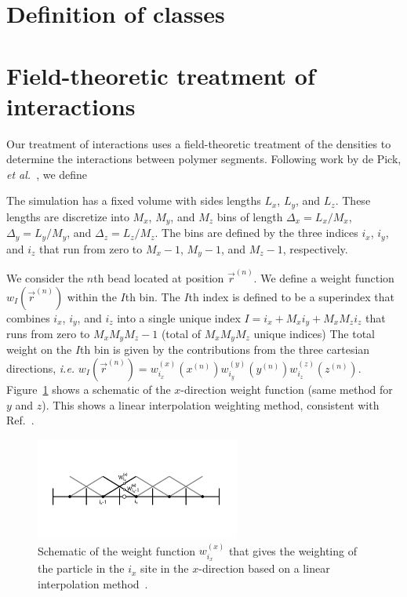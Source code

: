 \documentclass{simulation}
\begin{document}
\section{Definition of classes}



\newpage \clearpage

\section{Field-theoretic treatment of interactions}

Our treatment of interactions uses a field-theoretic treatment of the densities to determine the interactions between polymer
segments.  Following work by de Pick, \emph{et al.}~\cite{pikeTheoreticallyInformedCoarse2009}, we define 

The simulation has a fixed volume with sides lengths $L_{x}$, $L_{y}$, and $L_{z}$.
These lengths are discretize into $M_{x}$, $M_{y}$, and $M_{z}$ bins of length
$\Delta_{x} = L_{x}/M_{x}$, 
$\Delta_{y} = L_{y}/M_{y}$, and 
$\Delta_{z} = L_{z}/M_{z}$.
The bins are defined by the three indices 
$i_{x}$,
$i_{y}$, and
$i_{z}$ that run from zero to 
$M_{x}-1$, 
$M_{y}-1$, and
$M_{z}-1$, respectively.


We consider the $n$th bead located at position $\vec{r}^{(n)}$.
We define a weight function $w_{I}(\vec{r}^{(n)})$ within the $I$th bin.  
The $I$th index is defined to be a superindex that combines 
$i_{x}$,
$i_{y}$, and
$i_{z}$ into a single unique index $I= i_{x} + M_{x} i_{y} + M_{x}M_{z} i_{z}$ that
runs from zero to $M_{x}M_{y}M_{z}-1$ (total of $M_{x}M_{y}M_{z}$ unique indices)
The total weight on the $I$th bin is given by the contributions from the three cartesian
directions, \emph{i.e.} 
$w_{I}(\vec{r}^{(n)}) = 
w_{i_{x}}^{(x)}(x^{(n)})
w_{i_{y}}^{(y)}(y^{(n)})
w_{i_{z}}^{(z)}(z^{(n)})$.
Figure~\ref{fig:weight} shows a schematic of the $x$-direction weight function (same method for $y$ and $z$).
This shows a linear interpolation weighting method, consistent with Ref.~\cite{pikeTheoreticallyInformedCoarse2009}.

\begin{figure}[b]
	\centering
	\includegraphics[width=0.6\textwidth]{figures/weight.pdf} 
    \caption{
    Schematic of the weight function $w_{i_{x}}^{(x)}$ that gives the weighting of the particle in the $i_{x}$ site in the
    $x$-direction based on a linear interpolation method~\cite{pikeTheoreticallyInformedCoarse2009}.
        }
        \label{fig:weight}
\end{figure}
\end{document}
